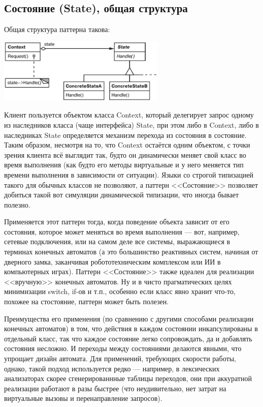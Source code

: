 \documentclass{../../text-style}
\begin{document}
\subsection{Состояние (State), общая структура}

Общая структура паттерна такова:

\begin{center}
    \includegraphics[width=0.6\textwidth]{state.png}
\end{center}

Клиент пользуется объектом класса Context, который делегирует запрос одному из наследников класса (чаще интерфейса) State, при этом либо в Context, либо в наследниках State определяется механизм перехода из состояния в состояние. Таким образом, несмотря на то, что Context остаётся одним объектом, с точки зрения клиента всё выглядит так, будто он динамически меняет свой класс во время выполнения (как будто его методы виртуальные и у него меняется тип времени выполнения в зависимости от ситуации). Языки со строгой типизацией такого для обычных классов не позволяют, а паттерн <<Состояние>> позволяет добиться такой вот симуляции динамической типизации, что иногда бывает полезно.

Применяется этот паттерн тогда, когда поведение объекта зависит от его состояния, которое может меняться во время выполнения --- вот, например, сетевые подключения, или на самом деле все системы, выражающиеся в терминах конечных автоматов (а это большинство реактивных систем, начиная от дверного замка, заканчивая робототехническим комплексом или ИИ в компьютерных играх). Паттерн <<Состояние>> также идеален для реализации <<вручную>> конечных автоматов. Ну и в чисто прагматических целях минимизации switch, if-ов и т.п., особенно если класс явно хранит что-то, похожее на стостояние, паттерн может быть полезен.

Преимущества его применения (по сравнению с другими способами реализации конечных автоматов) в том, что действия в каждом состоянии инкапсулированы в отдельный класс, так что каждое состояние легко сопровождать, да и добавлять состояния несложно. И переходы между состояниями делаются явными, что упрощает дизайн автомата. Для применений, требующих скорости работы, однако, такой подход используется редко --- например, в лексических анализаторах скорее сгенерированнные таблицы переходов, они при аккуратной реализации работают в разы быстрее (что неудивительно, нет затрат на виртуальные вызовы и перенаправление запросов).
\end{document}
